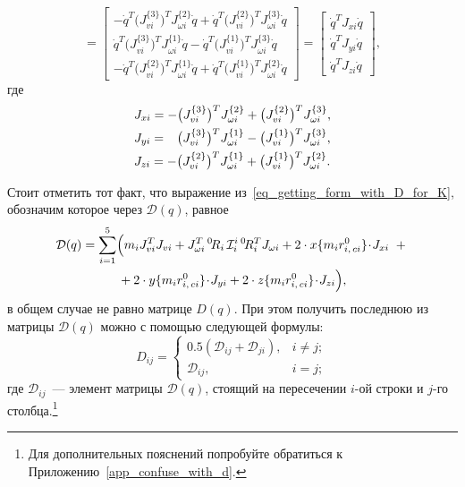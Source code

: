 \begin{equation}
    =
    \begin{bmatrix}
        -\dot{q}^T \bigl(J_{vi}^{\{3\}} \bigr)^T J_{\omega i}^{\{2\}} \dot{q} +
        \dot{q}^T \bigl( J_{vi}^{\{2\}} \bigr)^T J_{\omega i}^{\{3\}} \dot{q}
        \\
        \dot{q}^T \bigl( J_{vi}^{\{3\}} \bigr)^T J_{\omega i}^{\{1\}} \dot{q} -
        \dot{q}^T \bigl( J_{vi}^{\{1\}} \bigr)^T J_{\omega i}^{\{3\}} \dot{q}
        \\
        -\dot{q}^T \bigl( J_{vi}^{\{2\}} \bigr)^T J_{\omega i}^{\{1\}} \dot{q} +
        \dot{q}^T \bigl( J_{vi}^{\{1\}} \bigr)^T J_{\omega i}^{\{2\}} \dot{q}
    \end{bmatrix}
    =
    \begin{bmatrix}
        \dot{q}^T \! J_{xi} \dot{q} \\
        \dot{q}^T \! J_{yi} \dot{q} \\
        \dot{q}^T \! J_{zi} \dot{q}
    \end{bmatrix}\!\!,
\end{equation}
где
\begin{align}
    &J_{xi} =  - \bigl( J_{vi}^{\{3\}} \bigr)^T J_{\omega i}^{\{2\}} + \bigl( J_{vi}^{\{2\}} \bigr)^T J_{\omega i}^{\{3\}}, \\
    &J_{yi} = \phantom{-}\bigl( J_{vi}^{\{3\}} \bigr)^T J_{\omega i}^{\{1\}} - \bigl( J_{vi}^{\{1\}} \bigr)^T J_{\omega i}^{\{3\}}, \\
    &J_{zi} =  - \bigl( J_{vi}^{\{2\}} \bigr)^T J_{\omega i}^{\{1\}} + \bigl( J_{vi}^{\{1\}} \bigr)^T J_{\omega i}^{\{2\}} \ldotp
\end{align}

Стоит отметить тот факт, что выражение из~\eqref{eq_getting_form_with_D_for_K}, обозначим которое через $\mathcal{D}(q)$, равное
\begin{gather}
    \mathcal{D}(q) = \sum_{i=1}^5 \Bigl(m_i J_{vi}^T J_{vi} + J_{\omega i}^T \, {}^0\!R_i \, \mathcal{I}^{i}_i \, {}^0\!R_i^T J_{\omega i} + 2 \cdot x\{ m_i r^0_{i,\,ci} \} \!\cdot\! J_{xi} \,\, + {}\notag \\
    {} + 2 \cdot y\{ m_i r^0_{i,\,ci} \} \!\cdot\! J_{yi} + 2 \cdot z\{ m_i r^0_{i,\,ci} \} \!\cdot\! J_{zi}\Bigr),
\end{gather}
в общем случае не равно матрице $D(q)$.
При этом получить последнюю из матрицы $\mathcal{D}(q)$ можно с помощью следующей формулы:
\begin{equation}
    D_{ij} =
    \begin{cases}
        0.5 (\mathcal{D}_{ij} + \mathcal{D}_{ji}), & i \ne j; \\
        \mathcal{D}_{ij}, & i = j;
    \end{cases}
\end{equation}
где $\mathcal{D}_{ij}$~--- элемент матрицы $\mathcal{D}(q)$, стоящий на пересечении $i$-ой строки и $j$-го столбца\lefteqn.\footnote{Для дополнительных пояснений попробуйте обратиться к Приложению~\ref{app_confuse_with_d}.}

\newpage
